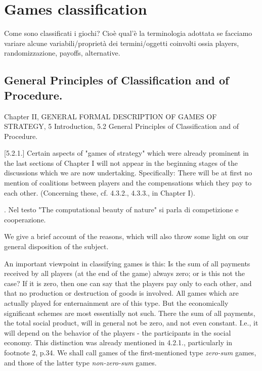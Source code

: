 \chapter{Games classification}
Come sono classificati i giochi? Cio\`e qual'\`e la terminologia adottata se facciamo variare alcune variabili/propriet\`a dei termini/oggetti coinvolti ossia players, randomizzazione, payoffs, alternative.

\section{General Principles of Classification and of Procedure. \cite{vonNeumann1944}}
Chapter II, GENERAL FORMAL DESCRIPTION OF GAMES OF STRATEGY, 5 Introduction, 5.2 General Principles of Classification and of Procedure.

[5.2.1.] Certain aspects of "games of strategy" which were already prominent in the last sections of Chapter I will not appear in the beginning stages of the discussions which we are now undertaking. Specifically: There will be at first no mention of coalitions between players and the compensations which they pay to each other. (Concerning these, cf. 4.3.2., 4.3.3., in Chapter I).

. Nel testo "The computational beauty of nature" si parla di competizione e cooperazione.

We give a brief account of the reasons, which will also throw some light on our general disposition of the subject.

An important viewpoint in classifying games is this: Is the sum of all payments received by all players (at the end of the game) always zero; or is this not the case? If it is zero, then one can say that the players pay only to each other, and that no production or destruction of goods is involved. All games which are actually played for enternainment are of this type. But the economically significant schemes are most essentially not such. There the sum of all payments, the total social product, will in general not be zero, and not even constant. I.e., it will depend on the behavior of the players - the participants in the social economy. This distinction was already mentioned in 4.2.1., particularly in footnote 2, p.34. We shall call games of the first-mentioned type \emph{zero-sum} games, and those of the latter type \emph{non-zero-sum} games.

